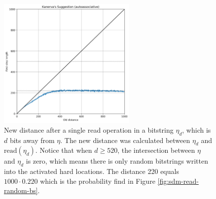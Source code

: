\documentclass[12pt]{article}
\begin{document}
\begin{figure}[!htb]
  \centering
  \includegraphics[width=0.6\textwidth]{./images02/autocorrelation/single-read-dist.png}

  \caption{New distance after a single read operation in a bitstring $\eta_d$, which is $d$ bits away from $\eta$. The new distance was calculated between $\eta_d$ and $\text{read}(\eta_d)$. Notice that when $d \ge 520$, the intersection between $\eta$ and $\eta_d$ is zero, which means there is only random bitstrings written into the activated hard locations. The distance 220 equals $1000 \cdot 0.220$ which is the probability find in Figure \ref{fig:sdm-read-random-bs}.}
  \label{fig:sdm-single-read-dist}
\end{figure}
\end{document}
